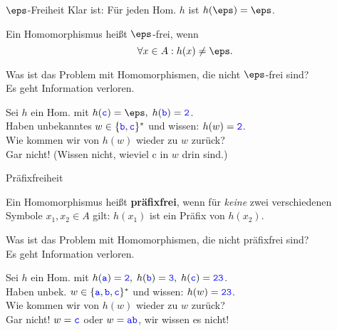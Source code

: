 \begin{frame}{$\eps$-Freiheit}
	Klar ist: Für jeden Hom. $h$ ist $h(\eps) = \eps$.
	
	\pause
	\begin{Definition}
		Ein Homomorphismus heißt $\eps$-frei, wenn 	$$ \forall x\in A : h(x) \neq \eps. $$
	\end{Definition}

	
	Was ist das Problem mit Homomorphismen, die nicht $\eps$-frei sind? \\ \pause
	\impl Es geht Information verloren.\\
	
	\begin{Beispiel}
		Sei $h$ ein Hom. mit $h(\word c) = \eps, \; h(\word b) = \word 2$. \\
		Haben unbekanntes $w \in \{\hbox{\textcolor{blue}{\texttt{b}}}, \hbox{\textcolor{blue}{\texttt{c}}}\}^*$ und wissen: $h(w) = \hbox{\textcolor{blue}{\texttt{2}}}$. \\
		\smallskip
		Wie kommen wir von $h(w)$ wieder zu $w$ zurück? \\ \pause
		\impl Gar nicht! (Wissen nicht, wieviel \word c in $w$ drin sind.)
	\end{Beispiel}
\end{frame}

\begin{frame}{Präfixfreiheit}
	\begin{Definition}
		Ein Homomorphismus heißt \textbf{präfixfrei}, wenn für
		\emph{keine} zwei verschiedenen Symbole $x_1,x_2\in A$ gilt: $h(x_1)$
		ist ein Präfix von $h(x_2)$.
	\end{Definition}

	\bigskip
	Was ist das Problem mit Homomorphismen, die nicht präfixfrei sind? \\ \pause
	\impl Es geht Information verloren.\\
	
	\begin{Beispiel}
		Sei $h$ ein Hom. mit $h(\hbox{\textcolor{blue}{\texttt{a}}}) = \hbox{\textcolor{blue}{\texttt{2}}}, \; h(\hbox{\textcolor{blue}{\texttt{b}}}) = \hbox{\textcolor{blue}{\texttt{3}}}, \; h(\hbox{\textcolor{blue}{\texttt{c}}}) = \hbox{\textcolor{blue}{\texttt{23}}}$. \\ 
		Haben unbek. $w \in \{\hbox{\textcolor{blue}{\texttt{a}}}, \hbox{\textcolor{blue}{\texttt{b}}}, \hbox{\textcolor{blue}{\texttt{c}}}\}^*$ und wissen: $h(w) = \hbox{\textcolor{blue}{\texttt{23}}}$. \\
		\smallskip
		Wie kommen wir von $h(w)$ wieder zu $w$ zurück?\\ \pause
		\impl Gar nicht! $w = \hbox{\textcolor{blue}{\texttt{c}}}$ oder $w = \hbox{\textcolor{blue}{\texttt{ab}}}$, wir wissen es nicht!
	\end{Beispiel}
	
\end{frame}

